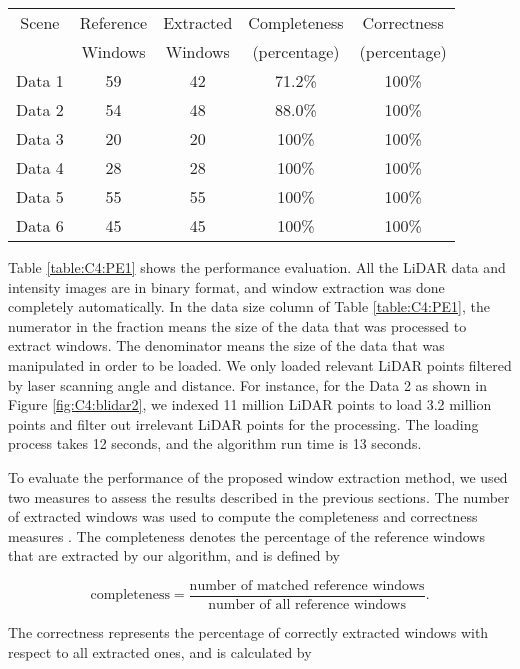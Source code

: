 \begin{table}
\centering
{}
\begin{tabular}{|c|c|c|c|c|}
\hline
Scene & Reference & Extracted   & Completeness & Correctness \\
& Windows & Windows & (percentage) &(percentage) \\
\hline
Data 1 &  59 & 42 & 71.2\% & 100\%\\
\hline
Data  2 &  54 & 48 & 88.0\% & 100\%\\
\hline
Data  3 &  20 & 20 & 100\% & 100\%\\
\hline
Data  4 &  28 & 28 & 100\% & 100\%\\
\hline
Data 5 &  55 & 55 & 100\% & 100\%\\
\hline
Data  6 &  45 & 45 & 100\% & 100\%\\
\hline

\end{tabular}
\label{table:C4:PE2}
\end{table}

Table \ref{table:C4:PE1} shows the performance evaluation. All the LiDAR data and intensity images are in binary format, and window extraction was done completely automatically. In the data size column of Table \ref{table:C4:PE1}, the numerator in the fraction means the size of the data that was processed to extract windows. The denominator means the size of the data that was manipulated in order to be loaded. We only loaded relevant LiDAR points filtered by laser scanning angle and distance. For instance, for the Data 2 as shown in Figure \ref{fig:C4:blidar2}, we indexed 11 million LiDAR points to load 3.2 million points and filter out irrelevant LiDAR points for the processing. The loading process takes 12 seconds, and the algorithm run time is 13 seconds. 

To evaluate the performance of the proposed window extraction method, we used two measures to assess the results described in the previous sections. The number of extracted windows was used to compute the completeness and correctness measures \cite{Heipke97evaluationof}. The completeness denotes the percentage of the reference windows that are extracted by our algorithm, and is defined by

\[
 \text{completeness} = \frac{\text{number of matched reference windows}}{\text{number of all reference windows}}.
\]

The correctness represents the percentage of correctly extracted windows with respect to all extracted ones, and is calculated by 

